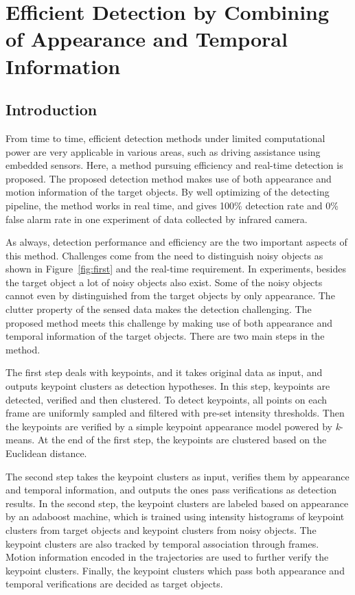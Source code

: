 \chapter{Efficient Detection by Combining of Appearance and Temporal Information }
\label{chp3}

\section{Introduction}

From time to time, efficient detection methods under limited computational power are very applicable in various areas, such as driving assistance using embedded sensors. Here, a method pursuing efficiency and real-time detection is proposed.
The proposed detection method makes use of both
appearance and motion information of the target objects. By well optimizing of the detecting pipeline, the
method works in real time, and gives 100\% detection rate and 0\% false alarm rate in one experiment of data collected by infrared camera.

As always, detection performance and efficiency are the two important aspects of this method. Challenges come from the need to distinguish noisy objects as shown in Figure~\ref{fig:first} and the real-time requirement. In experiments, besides the target object a lot of noisy objects also exist. Some of the noisy objects cannot even by distinguished from the target objects by only appearance.  The clutter property of the sensed data makes the detection challenging. The proposed method meets this challenge by making use of both appearance and temporal information of the target objects. There are two main steps in the method.

The first step deals with keypoints, and  it takes original data as input, and outputs keypoint clusters as detection hypotheses. In this step, keypoints are detected, verified and then clustered. To detect keypoints, all points on each frame are uniformly sampled and filtered with pre-set intensity thresholds.  Then the keypoints are verified by a simple keypoint appearance model   powered by \emph{k}-means. At the end of the first step, the keypoints are clustered based on the Euclidean distance.

The second step takes the keypoint clusters as input, verifies them by appearance and temporal information, and outputs the ones pass verifications as detection results. In the second step, the keypoint clusters are labeled based on appearance by an adaboost machine, which is trained using intensity histograms of keypoint clusters from target objects and keypoint clusters from noisy objects. The keypoint clusters are also tracked by temporal association through frames. Motion information encoded in the trajectories are used to further verify the keypoint clusters. Finally, the keypoint clusters which pass both appearance and temporal verifications are decided as target objects.

